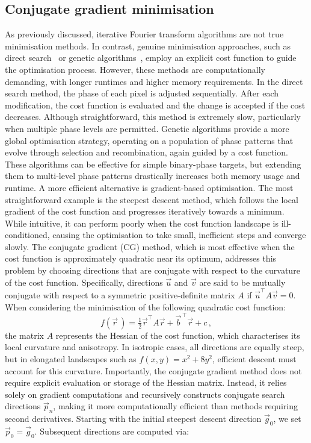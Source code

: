 \documentclass[../Thesis-IJspeert.tex]{subfiles}
\begin{document}
\subsection{Conjugate gradient minimisation}
As previously discussed, iterative Fourier transform algorithms are not true minimisation methods. In contrast, genuine minimisation approaches, such as direct search~\cite{Clark1996} or genetic algorithms~\cite{michalewicz1999genetic}, employ an explicit cost function to guide the optimisation process. However, these methods are computationally demanding, with longer runtimes and higher memory requirements. In the direct search method, the phase of each pixel is adjusted sequentially. After each modification, the cost function is evaluated and the change is accepted if the cost decreases. Although straightforward, this method is extremely slow, particularly when multiple phase levels are permitted. Genetic algorithms provide a more global optimisation strategy, operating on a population of phase patterns that evolve through selection and recombination, again guided by a cost function. These algorithms can be effective for simple binary-phase targets, but extending them to multi-level phase patterns drastically increases both memory usage and runtime. A more efficient alternative is gradient-based optimisation. The most straightforward example is the steepest descent method, which follows the local gradient of the cost function and progresses iteratively towards a minimum. While intuitive, it can perform poorly when the cost function landscape is ill-conditioned, causing the optimisation to take small, inefficient steps and converge slowly. The conjugate gradient (CG) method, which is most effective when the cost function is approximately quadratic near its optimum, addresses this problem by choosing directions that are conjugate with respect to the curvature of the cost function. Specifically, directions $ \vec{u} $ and $ \vec{v} $ are said to be mutually conjugate with respect to a symmetric positive-definite matrix $ A $ if $\vec{u}^\top A \vec{v} = 0$. When considering the minimisation of the following quadratic cost function:
\begin{equation}
f(\vec{r}\,) = \tfrac{1}{2} \vec{r}^\top A \vec{r} + \vec{b}^{\,\top} \vec{r} + c\,,
\end{equation}
the matrix $ A $ represents the Hessian of the cost function, which characterises its local curvature and anisotropy. In isotropic cases, all directions are equally steep, but in elongated landscapes such as $ f(x,y) = x^2 + 8y^2 $, efficient descent must account for this curvature. Importantly, the conjugate gradient method does not require explicit evaluation or storage of the Hessian matrix. Instead, it relies solely on gradient computations and recursively constructs conjugate search directions $\vec{p}_n$, making it more computationally efficient than methods requiring second derivatives. Starting with the initial steepest descent direction $\vec{g}_0$, we set $\vec{p}_0 = \vec{g}_0$. Subsequent directions are computed via:
\end{document}
